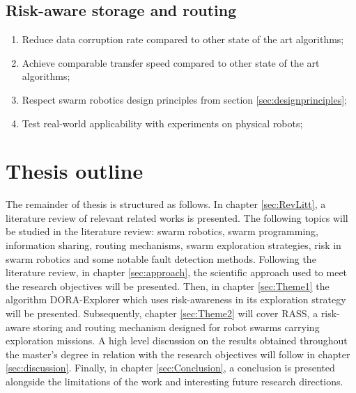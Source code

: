 \subsection{Risk-aware storage and routing}
\begin{enumerate}
    \item Reduce data corruption rate compared to other state of the art algorithms;
    \item Achieve comparable transfer speed compared to other state of the art algorithms;
    \item Respect swarm robotics design principles from section \ref{sec:designprinciples};
    \item Test real-world applicability with experiments on physical robots;
\end{enumerate}


\section{Thesis outline}  %
The remainder of thesis is structured as follows. In chapter \ref{sec:RevLitt}, a literature review of relevant related works is presented. The following topics will be studied in the literature review: swarm robotics, swarm programming, information sharing, routing mechanisms, swarm exploration strategies, risk in swarm robotics and some notable fault detection methods. Following the literature review, in chapter \ref{sec:approach}, the scientific approach used to meet the research objectives will be presented. Then, in chapter \ref{sec:Theme1} the algorithm DORA-Explorer which uses risk-awareness in its exploration strategy will be presented. Subsequently, chapter \ref{sec:Theme2} will cover RASS, a risk-aware storing and routing mechanism designed for robot swarms carrying exploration missions. A high level discussion on the results obtained throughout the master's degree in relation with the research objectives will follow in chapter \ref{sec:discussion}. Finally, in chapter \ref{sec:Conclusion}, a conclusion is presented alongside the limitations of the work and interesting future research directions.